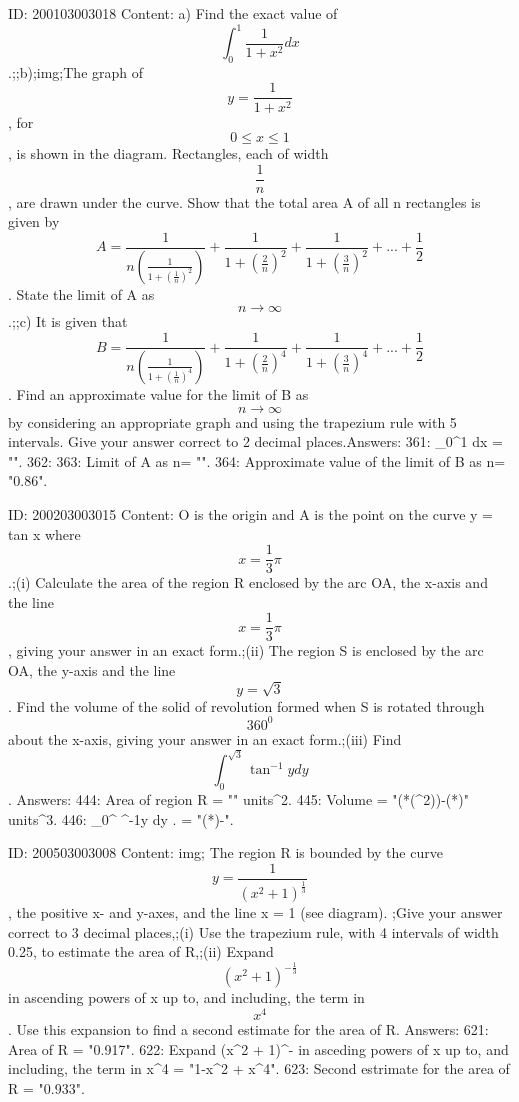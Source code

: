 \documentclass{article}
\begin{document}
ID: 200103003018
Content:
a) Find the exact value of  $$\int_0^1 \frac{1}{1 + x^2}dx $$.;;b);img;The graph of  $$y = \frac{1}{1 + x^2}$$, for  $$0 \le x \le 1$$, is shown in the diagram. Rectangles, each of width  $$\frac{1}{n}$$, are drawn under the curve. Show that the total area A of all n rectangles is given by $$A = \frac{1}{n\left(\frac{1}{1 + (\frac{1}{n})^2}\right)} + \frac{1}{1 + (\frac{2}{n})^2} + \frac{1}{1 + (\frac{3}{n})^2} + ... + \frac{1}{2}$$. State the limit of A as  $$n \to \infty $$.;;c) It is given that $$B = \frac{1}{n\left(\frac{1}{1 + (\frac{1}{n})^4}\right)} + \frac{1}{1 + (\frac{2}{n})^4}+ \frac{1}{1 + (\frac{3}{n})^4}+ ... + \frac{1}{2}$$. Find an approximate value for the limit of B as  $$n \to \infty $$ by considering an appropriate graph and using the trapezium rule with 5 intervals. Give your answer correct to 2 decimal places.Answers:
361: \int_0^1  dx = "".
362: 
363: Limit of A as n\rightarrow\infty = "".
364: Approximate value of the limit of B as n\rightarrow\infty = "0.86".

ID: 200203003015
Content:
O is the origin and A is the point on the curve y = tan x where  $$x = \frac{1}{3}\pi $$.;(i) Calculate the area of the region R enclosed by the arc OA, the x-axis and the line  $$x = \frac{1}{3}\pi $$, giving your answer in an exact form.;(ii) The region S is enclosed by the arc OA, the y-axis and the line  $$y = \sqrt 3 $$. Find the volume of the solid of revolution formed when S is rotated through  $$360^0 $$ about the x-axis, giving your answer in an exact form.;(iii) Find  $$\int_0^{\sqrt 3} \tan ^{-1} y dy $$. Answers:
444: Area of region R = "" units^2.
445: Volume = "(*(\pi^2))-(*\pi)" units^3.
446: \int_0^{} \tan^{-1}{y} \space dy . = "(*\pi)-".

ID: 200503003008
Content:
img; The region R is bounded by the curve  $$y = \frac{1}{{( x^2 + 1 )}^{\frac{1}{3}}}$$, the positive x- and y-axes, and the line x = 1 (see diagram). ;Give your answer correct to 3 decimal places,;(i) Use the trapezium rule, with 4 intervals of width 0.25, to estimate the area of R,;(ii) Expand $${( x^2 + 1 )}^{- \frac{1}{3}}$$  in ascending powers of x up to, and including, the term in $$x^4$$. Use this expansion to find a second estimate for the area of R. Answers:
621: Area of R = "0.917".
622: Expand (x^2 + 1)^{-} in asceding powers of x up to, and including, the term in x^4 = "1-x^2 + x^4".
623: Second estrimate for the area of R = "0.933".
\end{document}
